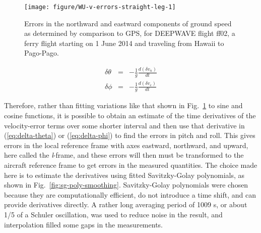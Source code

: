 \documentclass[12pt,twoside,english]{article}\usepackage[]{graphicx}\usepackage[]{color}
\makeatletter
\newenvironment{kframe}{%
 \def\at@end@of@kframe{}%
 \ifinner\ifhmode%
  \def\at@end@of@kframe{\end{minipage}}%
  \begin{minipage}{\columnwidth}%
 \fi\fi%
 \def\FrameCommand##1{\hskip\@totalleftmargin \hskip-\fboxsep
 \colorbox{shadecolor}{##1}\hskip-\fboxsep
     \hskip-\linewidth \hskip-\@totalleftmargin \hskip\columnwidth}%
 \MakeFramed {\advance\hsize-\width
   \@totalleftmargin\z@ \linewidth\hsize
   \@setminipage}}%
 {\par\unskip\endMakeFramed%
 \at@end@of@kframe}
\newenvironment{knitrout}{}{} %
\let\OrgIndex\index
\renewcommand*{\index}[1]{\OrgIndex{#1}}
\makeatother
\begin{document}
\begin{knitrout}\footnotesize
{}\color{fgcolor}\begin{kframe}


{\ttfamily\noindent\bfseries{}}\end{kframe}\begin{figure}

{\centering \texttt{[image: figure/WU-v-errors-straight-leg-1]} 

}

\caption[Errors in the northward and eastward components of ground speed as determined by comparison to GPS, for DEEPWAVE flight ff02, a ferry flight starting on 1 June 2014 and traveling from Hawaii to Pago-Pago]{Errors in the northward and eastward components of ground speed as determined by comparison to GPS, for DEEPWAVE flight ff02, a ferry flight starting on 1 June 2014 and traveling from Hawaii to Pago-Pago.}\label{fig:v-errors-straight-leg}
\end{figure}


\end{knitrout}


\begin{eqnarray}
\delta\theta & = & -\frac{1}{g}\frac{d(\delta v_{n})}{dt}\label{eq:delta-theta}\\ 
\delta\phi & = & -\frac{1}{g}\frac{d(\delta v_{e})}{dt}\label{eq:delta-phi} 
\end{eqnarray}


Therefore, rather than fitting variations like that shown in Fig.~\ref{fig:v-errors-straight-leg} to sine and cosine functions, it is possible to obtain an estimate of the time derivatives of the velocity-error terms over some shorter interval and then use that derivative in (\ref{eq:delta-theta}) or (\ref{eq:delta-phi}) to find the errors in pitch and roll. This gives errors in the local reference frame with axes eastward, northward, and upward, here called the\emph{ l}-frame, and these errors will then must be transformed to the aircraft reference frame to get errors in the measured quantities. The choice made here is to estimate the derivatives using fitted Savitzky-Golay polynomials, as shown in Fig.~\ref{fig:sg-poly-smoothing}. Savitzky-Golay polynomials were chosen because they are computationally efficient, do not introduce a time shift, and can provide derivatives directly. A rather long averaging period of 1009 s, or about 1/5 of a Schuler oscillation, was used to reduce noise in the result, and interpolation filled some gaps in the measurements. 
\end{document}
